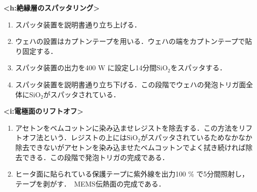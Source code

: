 \newpage
\textbf{<h:絶縁層のスパッタリング>}

\begin{enumerate}
\item スパッタ装置を説明書通り立ち上げる． 
\item ウェハの設置はカプトンテープを用いる．ウェハの端をカプトンテープで貼り固定する．
\item スパッタ装置の出力を400 W に設定し14分間SiO$_{2}$をスパッタする．
\item スパッタ装置を説明書通り立ち下げる．この段階でウェハの発泡トリガ面全体にSiO$_{2}$がスパッタされている．
\end{enumerate} 

\vspace{5zh}
\textbf{<i:電極面のリフトオフ>}

\begin{enumerate}
\item アセトンをベムコットンに染み込ませレジストを除去する．この方法をリフトオフ法という．レジストの上にはSiO$_{2}$がスパッタされているためなかなか除去できないがアセトンを染み込ませたベムコットンでよく拭き続ければ除去できる．この段階で発泡トリガの完成である．


\item ヒータ面に貼られている保護テープに紫外線を出力100 \% で5分間照射し，テープを剥がす．　MEMS伝熱面の完成である．

\end{enumerate} 